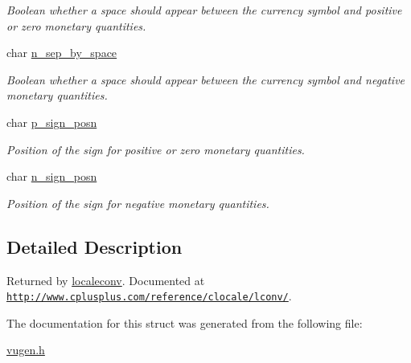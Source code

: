 \begin{DoxyCompactItemize}
\begin{DoxyCompactList}\small\item\em Boolean whether a space should appear between the currency symbol and positive or zero monetary quantities. \end{DoxyCompactList}\item 
\hypertarget{structlconv_ab7ac20ce034900155183b32fc3c6d9a3}{char \hyperlink{structlconv_ab7ac20ce034900155183b32fc3c6d9a3}{n\-\_\-sep\-\_\-by\-\_\-space}}\label{structlconv_ab7ac20ce034900155183b32fc3c6d9a3}

\begin{DoxyCompactList}\small\item\em Boolean whether a space should appear between the currency symbol and negative monetary quantities. \end{DoxyCompactList}\item 
\hypertarget{structlconv_a1fdead36abe5c2ca673142ea401478e8}{char \hyperlink{structlconv_a1fdead36abe5c2ca673142ea401478e8}{p\-\_\-sign\-\_\-posn}}\label{structlconv_a1fdead36abe5c2ca673142ea401478e8}

\begin{DoxyCompactList}\small\item\em Position of the sign for positive or zero monetary quantities. \end{DoxyCompactList}\item 
\hypertarget{structlconv_ae0bbe6f545952daef5a8cbdd054a184e}{char \hyperlink{structlconv_ae0bbe6f545952daef5a8cbdd054a184e}{n\-\_\-sign\-\_\-posn}}\label{structlconv_ae0bbe6f545952daef5a8cbdd054a184e}

\begin{DoxyCompactList}\small\item\em Position of the sign for negative monetary quantities. \end{DoxyCompactList}\end{DoxyCompactItemize}


\subsection{Detailed Description}
Returned by \hyperlink{group__locale_ga69b40f71a20a7c8bd67b9eeeae7f40c9}{localeconv}. Documented at \href{http://www.cplusplus.com/reference/clocale/lconv/}{\tt http\-://www.\-cplusplus.\-com/reference/clocale/lconv/}. 

The documentation for this struct was generated from the following file\-:\begin{DoxyCompactItemize}
\item 
\hyperlink{vugen_8h}{vugen.\-h}\end{DoxyCompactItemize}
